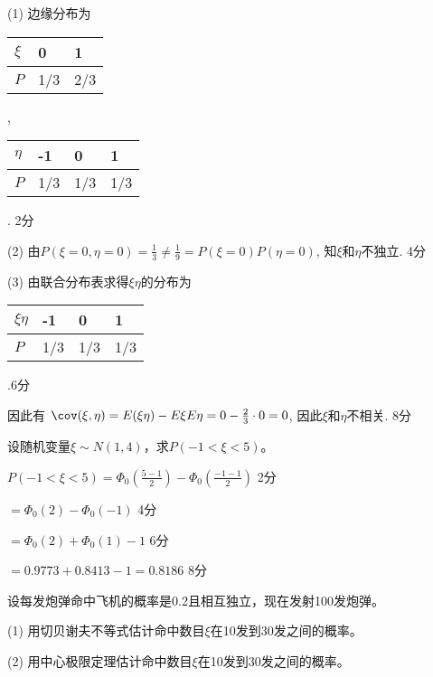 \begin{solution}
(1) 边缘分布为 \begin{tabular}{|l|l|l|}
  \hline
  $\xi$ & 0 & 1\\
  \hline
  $P$ & 1/3 & 2/3\\
  \hline
\end{tabular}, \ \begin{tabular}{|l|l|l|l|}
  \hline
  $\eta$ & -1 & 0 & 1\\
  \hline
  $P$ & 1/3 & 1/3 & 1/3\\
  \hline
\end{tabular}. \dotfill 2分 \par
(2) 由$P(\xi = 0, \eta = 0) = \frac{1}{3} \neq \frac{1}{9} = P(\xi = 0) P(\eta = 0)$,
知$\xi$和$\eta$不独立. \dotfill 4分 \par
(3) 由联合分布表求得$\xi \eta$的分布为 \begin{tabular}{|l|l|l|l|}
  \hline
  $\xi \eta$ & -1 & 0 & 1\\
  \hline
  $P$ & 1/3 & 1/3 & 1/3\\
  \hline
\end{tabular}.\dotfill 6分\par
因此有 $\cov(\xi, \eta) = E(\xi\eta) - E\xi E\eta = 0 -\frac{2}{3} \cdot 0 = 0$,
因此$\xi$和$\eta$不相关. \dotfill 8分
\end{solution}


\begin{question}
设随机变量$\xi \sim N (1, 4)$，求$P (- 1 < \xi < 5)$。
\end{question}

\begin{solution}
$P(-1<\xi<5) = \Phi_0\left(\frac{5-1}{2}\right) - \Phi_0\left(\frac{-1-1}{2}\right)$ \dotfill 2分 \par
\qquad $= \Phi_0 (2) - \Phi_0 (- 1)$ \dotfill 4分 \par
\qquad $= \Phi_0 (2) + \Phi_0 (1) - 1$ \dotfill 6分 \par
\qquad $= 0.9773 + 0.8413 - 1 = 0.8186$ \dotfill 8分
\end{solution}



\begin{question}
设每发炮弹命中飞机的概率是0.2且相互独立，现在发射100发炮弹。\par
(1) 用切贝谢夫不等式估计命中数目$\xi$在10发到30发之间的概率。\par
(2) 用中心极限定理估计命中数目$\xi$在10发到30发之间的概率。
\end{question}

